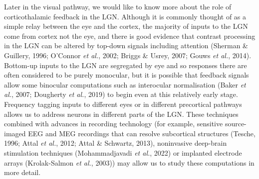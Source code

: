 \documentclass[
  letterpaper,
  DIV=11,
  numbers=noendperiod]{scrartcl}
\begin{document}
Later in the visual pathway, we would like to know more about the role
of corticothalamic feedback in the LGN. Although it is commonly thought
of as a simple relay between the eye and the cortex, the majority of
inputs to the LGN come from cortex not the eye, and there is good
evidence that contrast processing in the LGN can be altered by top-down
signals including attention (Sherman \& Guillery, 1996; O'Connor
\emph{et al.}, 2002; Briggs \& Usrey, 2007; Gouws \emph{et al.}, 2014).
Bottom-up inputs to the LGN are segregated by eye and so responses there
are often considered to be purely monocular, but it is possible that
feedback signals allow some binocular computations such as interocular
normalisation (Baker \emph{et al.}, 2007; Dougherty \emph{et al.}, 2019)
to begin even at this relatively early stage. Frequency tagging inputs
to different eyes or in different precortical pathways allows us to
address neurons in different parts of the LGN. These techniques combined
with advances in recording technology (for example, sensitive
source-imaged EEG and MEG recordings that can resolve subcortical
structures (Tesche, 1996; Attal \emph{et al.}, 2012; Attal \& Schwartz,
2013), noninvasive deep-brain stimulation techniques (Mohammadjavadi
\emph{et al.}, 2022) or implanted electrode arrays (Krolak-Salmon
\emph{et al.}, 2003)) may allow us to study these computations in more
detail.
\end{document}
